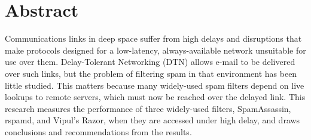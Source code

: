 \documentclass[a4paper,oneside,12pt]{book}
\title{\thesistitle}
\author{\authorname}
\newcommand{\typeofthesis}{Dissertation} %
\begin{document}

\doublespacing






\newpage
\chapter{Abstract}





Communications links in deep space suffer from high delays and disruptions that make protocols designed for a low-latency, always-available network unsuitable for use over them. Delay-Tolerant Networking (DTN) allows e-mail to be delivered over such links, but the problem of filtering spam in that environment has been little studied. This matters because many widely-used spam filters depend on live lookups to remote servers, which must now be reached over the delayed link. This research measures the performance of three widely-used filters, SpamAssassin, rspamd, and Vipul's Razor, when they are accessed under high delay, and draws conclusions and recommendations from the results.
\end{document}
